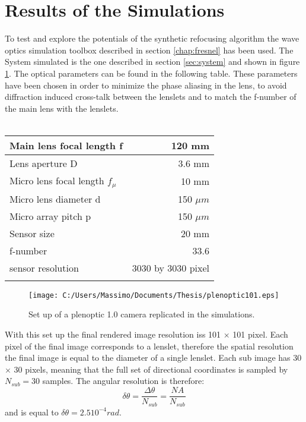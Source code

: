 \section{Results of the Simulations}
To test and explore the potentials of the synthetic refocusing algorithm the wave optics simulation toolbox described in section \ref{chap:fresnel} has been used. The System simulated is the one described in section \ref{sec:system} and shown in figure \ref{fig:pleno10_system2}. The optical parameters can be found in the following table. These parameters have been chosen in order to minimize the phase aliasing in the lens, to avoid diffraction induced cross-talk between the lenslets and to match the f-number of the main lens with the lenslets.
\\
\\
\begin{tabular}{l|r}
	\centering
	\hline
	Main lens focal length f & 120 mm\\ \hline
	Lens aperture D & 3.6 mm \\ \hline
	Micro lens focal length $f_{\mu}$ & 10 mm \\ \hline
	Micro lens diameter d & 150 $\mu m$ \\ \hline
	Micro array pitch p & 150 $\mu m$ \\ \hline
	Sensor size & 20 mm \\ \hline
	f-number & 33.6\\ \hline
	sensor resolution & 3030 by 3030 pixel \\ \hline	
	\label{tab:1}
\end{tabular}
\begin{figure}[H]
	\centering
	\texttt{[image: C:/Users/Massimo/Documents/Thesis/plenoptic101.eps]}
	\caption{\label{fig:pleno10_system2} Set up of a plenoptic 1.0 camera replicated in the simulations. }
\end{figure}		
With this set up the final rendered image resolution iss 101 $\times$ 101 pixel. Each pixel of the final image corresponds to a lenslet, therefore the spatial resolution the final image is equal to the diameter of a single lenslet. Each sub image has 30 $\times$ 30 pixels, meaning that the full set of directional coordinates is sampled by $N_{sub}=30$ samples. The angular resolution is therefore:
\begin{equation}
\label{eq:angularres}
\delta\theta = \dfrac{\Delta\theta}{N_{sub}}=\dfrac{NA}{N_{sub}}
\end{equation}
and is equal to $\delta\theta = 2.5 10^{-4} rad$.\\
